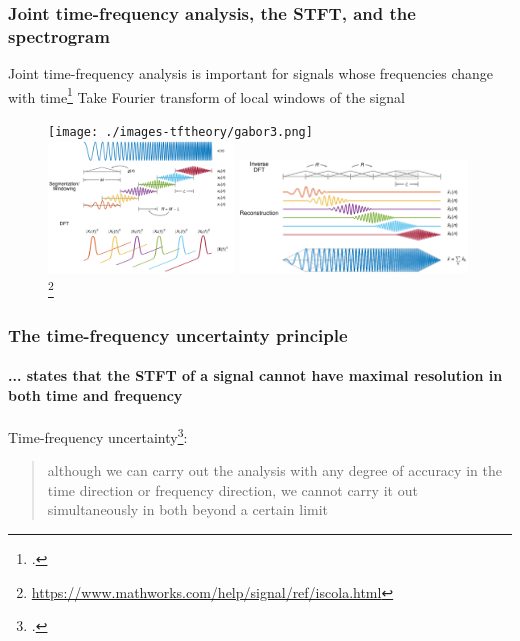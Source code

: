 \documentclass[usenames,dvipsnames]{beamer}
\begin{document}
\begin{frame}
	\frametitle{Joint time-frequency analysis, the STFT, and the spectrogram}
	Joint time-frequency analysis is important for signals whose frequencies change with time\footcite{gabor1946} Take Fourier transform of local windows of the signal
	\begin{figure}
		\texttt{[image: ./images-tftheory/gabor3.png]}\\
		\includegraphics[height=3.5cm]{./images-mila-presentation/stft_diagram1.png}
		\hspace{-0.75em}
		\includegraphics[height=3cm]{./images-mila-presentation/stft_diagram2.png}\footnote{\url{https://www.mathworks.com/help/signal/ref/iscola.html}}
	\end{figure}
\end{frame}

\begin{frame}
	\frametitle{The time-frequency uncertainty principle}
	\framesubtitle{... states that the STFT of a signal cannot have maximal resolution in both time and frequency}
	    Time-frequency uncertainty\footcite{gabor1946}:
	    \begin{quote}
		    although we can carry out the analysis with any degree of accuracy in the time direction or frequency direction, we cannot carry it out simultaneously in both beyond a certain limit
	    \end{quote}
	\begin{figure}[ht]
		\centering
		\vspace{-1.5em}
	\end{figure}
\end{frame}
\end{document}

